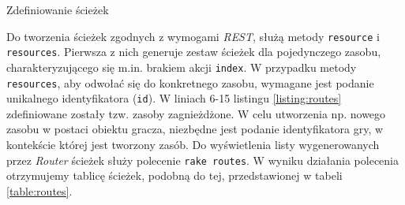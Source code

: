 \documentclass[11pt,twoside]{report}
\begin{document}
\begin{listing}
  
  \caption{Zdefiniowanie ścieżek}
  \label{listing:routes}
\end{listing}

Do tworzenia ścieżek zgodnych z wymogami \emph{REST}, służą metody
\texttt{resource} i \texttt{resources}. Pierwsza z nich generuje
zestaw ścieżek dla pojedynczego zasobu, charakteryzującego się
m.in. brakiem akcji \texttt{index}. W przypadku metody
\texttt{resources}, aby odwołać się do konkretnego zasobu, wymagane
jest podanie unikalnego identyfikatora (\texttt{id}). W liniach 6-15
listingu \ref{listing:routes} zdefiniowane zostały tzw. zasoby
zagnieżdżone. W celu utworzenia np. nowego zasobu w postaci obiektu
gracza, niezbędne jest podanie identyfikatora gry, w kontekście której
jest tworzony zasób. Do wyświetlenia listy wygenerowanych przez
\emph{Router} ścieżek służy polecenie \texttt{rake routes}. W wyniku
działania polecenia otrzymujemy tablicę ścieżek, podobną do tej,
przedstawionej w tabeli \ref{table:routes}.
\end{document}
